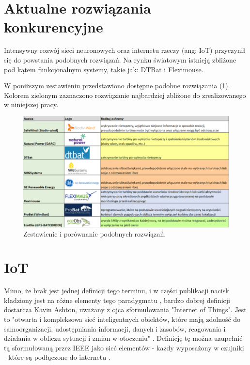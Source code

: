 \documentclass{sprz}
\begin{document}
\section{Aktualne rozwiązania konkurencyjne}

Intensywny rozwój sieci neuronowych oraz internetu rzeczy (ang: IoT) przyczynił się do powstania podobnych rozwiązań. Na rynku światowym istnieją zbliżone pod kątem funkcjonalnym systemy, takie jak: DTBat i Fleximouse. 

W poniższym zestawieniu przedstawiono dostępne podobne rozwiązania (\ref{img:konkurencja}). Kolorem zielonym zaznaczono rozwiązanie najbardziej zbliżone do zrealizowanego w niniejszej pracy.

\begin{figure}[h]
  \centering
  \includegraphics[width=1.0\textwidth]{sprz/konkurencja}
  \caption{Zestawienie i porównanie podobnych rozwiązań.}
  \label{img:konkurencja}
\end{figure} 

\section{IoT}

Mimo, że brak jest jednej definicji tego terminu, i w części publikacji nacisk kładziony jest na różne elementy tego paradygmatu \cite{iot-gov}, bardzo dobrej definicji dostarcza Kavin Ashton, uważany z ojca sformułowania "Internet of Things". Jest to "otwarta i kompleksowa sieć inteligentnych obiektów, które mają zdolność do samoorganizacji, udostępniania informacji, danych i zasobów, reagowania i działania w obliczu sytuacji i zmian w otoczeniu" \cite{Ashton2002}. Definicję tę można uzupełnić tą sformułowaną przez IEEE jako sieć elementów - każdy wyposażony w czujniki - które są podłączone do internetu \cite{IEEE-iot}.
\end{document}
